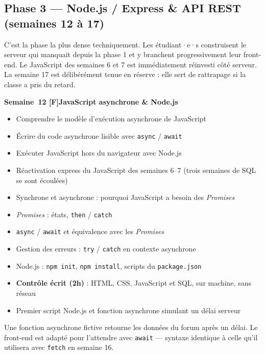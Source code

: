 \documentclass[a4paper,11pt]{article}
\newcommand{\semainetitre}[4]{%
  \needspace{9\baselineskip}%
  \vspace{8pt}
  \noindent
  \begin{tcolorbox}[
    enhanced, colback=cfptBlack, colframe=cfptBlack,
    boxrule=0pt, arc=3pt, boxsep=0pt,
    left=8pt, right=90pt, top=4pt, bottom=4pt,
    overlay={%
      \node[anchor=east, fill=cfptYellow, text=cfptBlack,
            rounded corners=2pt, inner xsep=6pt, inner ysep=3pt,
            font=\scriptsize\bfseries]
        at ([xshift=-6pt]frame.east) {#3};}
  ]
  \color{white}\bfseries\small Semaine~#1 \quad\textcolor{cfptYellow}{[#4]}\quad #2
  \end{tcolorbox}
  \vspace{-4pt}
}
\newcommand{\contenutitre}[1]{%
  \vspace{4pt}
  \noindent{\small\color{accentBlue}\textbf{#1}}\vspace{2pt}
}
\begin{document}
\newpage

\subsection{Phase 3 --- Node.js / Express \& API REST (semaines 12 à 17)}

\begin{tcolorbox}[intro]
\small C'est la phase la plus dense techniquement. Les étudiant·e·s construisent le serveur qui manquait depuis la phase 1 et y branchent progressivement leur front-end. Le JavaScript des semaines 6 et 7 est immédiatement réinvesti côté serveur. La semaine 17 est délibérément tenue en réserve : elle sert de rattrapage si la classe a pris du retard.
\end{tcolorbox}

\semainetitre{12}{JavaScript asynchrone \& Node.js}{3h cours / 4h TP}{F}
\begin{tcolorbox}[semaine]
\begin{tcolorbox}[objectifs]
\begin{itemize}
  \item Comprendre le modèle d'exécution asynchrone de JavaScript
  \item Écrire du code asynchrone lisible avec \texttt{async} / \texttt{await}
  \item Exécuter JavaScript hors du navigateur avec Node.js
\end{itemize}
\end{tcolorbox}
\vspace{4pt}
\contenutitre{Cours}
\begin{itemize}
  \item Réactivation express du JavaScript des semaines 6--7 (trois semaines de SQL se sont écoulées)
  \item Synchrone et asynchrone : pourquoi JavaScript a besoin des \textit{Promises}
  \item \textit{Promises} : états, \texttt{then} / \texttt{catch}
  \item \texttt{async} / \texttt{await} et équivalence avec les \textit{Promises}
  \item Gestion des erreurs : \texttt{try} / \texttt{catch} en contexte asynchrone
  \item Node.js : \texttt{npm init}, \texttt{npm install}, scripts du \texttt{package.json}
\end{itemize}
\contenutitre{Travaux pratiques}
\begin{itemize}
  \item \textbf{Contrôle écrit (2h)} : HTML, CSS, JavaScript et SQL, sur machine, sans réseau
  \item Premier script Node.js et fonction asynchrone simulant un délai serveur
\end{itemize}
\end{tcolorbox}
\begin{tcolorbox}[filrouge={Simuler l'appel serveur}]
\small Une fonction asynchrone fictive retourne les données du forum après un délai. Le front-end est adapté pour l'attendre avec \texttt{await} --- syntaxe identique à celle qu'il utilisera avec \texttt{fetch} en semaine 16.
\end{tcolorbox}
\end{document}
